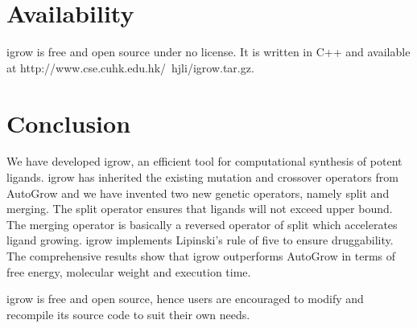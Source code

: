 \documentclass[10pt,conference,letterpaper]{IEEEtran}
\begin{document}
\section{Availability}
igrow is free and open source under no license. It is written in C++ and available at http://www.cse.cuhk.edu.hk/~hjli/igrow.tar.gz.

\section{Conclusion}\label{sec:conclusion}
We have developed igrow, an efficient tool for computational synthesis of potent ligands.
igrow has inherited the existing mutation and crossover operators from AutoGrow and we have invented two new genetic operators, namely split and merging.
The split operator ensures that ligands will not exceed upper bound.
The merging operator is basically a reversed operator of split which accelerates ligand growing.
igrow implements Lipinski's rule of five to ensure druggability.
The comprehensive results show that igrow outperforms AutoGrow in terms of free energy, molecular weight and execution time.

igrow is free and open source, hence users are encouraged to modify and recompile its source code to suit their own needs.



\end{document}
